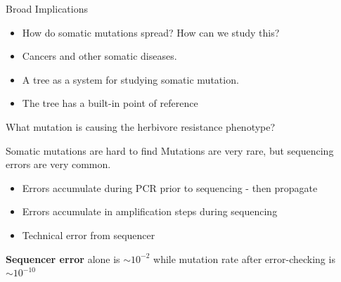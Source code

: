 \documentclass{beamer}
\begin{document}
\begin{frame}{Broad Implications}
	\begin{itemize}
	\item How do somatic mutations spread? How can we study this?
	\item Cancers and other somatic diseases.
	\item A tree as a system for studying somatic mutation.
	\item The tree has a built-in point of reference
	\end{itemize}



\end{frame}

\begin{frame}
\begin{center}
What mutation is causing the herbivore resistance phenotype?
\end{center}
\end{frame}




\begin{frame}{Somatic mutations are hard to find}
Mutations are very rare, but sequencing errors are very common.
\begin{itemize}
\item Errors accumulate during PCR prior to sequencing - then propagate
\item Errors accumulate in amplification steps during sequencing
\item Technical error from sequencer
\end{itemize}

\textbf{Sequencer error} alone is \textbf{$\sim10^{-2}$} while mutation rate after error-checking is \textbf{$\sim10^{-10}$}

\end{frame}
\end{document}
